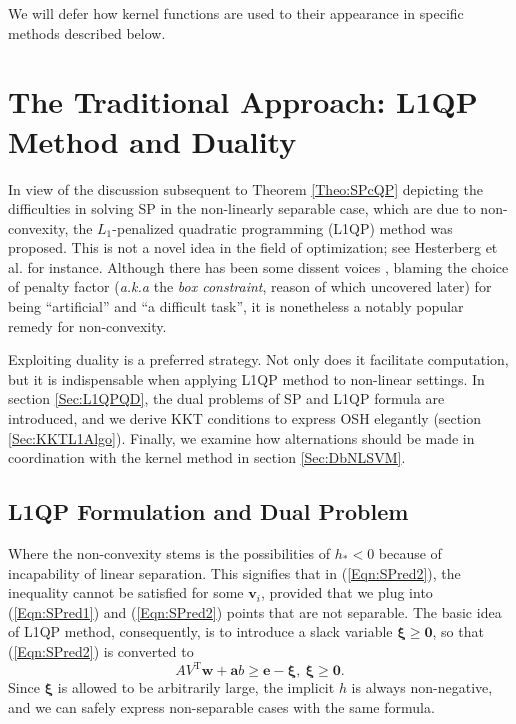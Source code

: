\documentclass[11pt,a4paper]{article}
\theoremstyle{definition}
\renewcommand{\vec}[1]{\boldsymbol{#1}}
\begin{document}
      We will defer how kernel functions are used to their appearance in specific methods described below.

  \section{The Traditional Approach: L1QP Method and Duality\label{Sec:L1QP}}
    In view of the discussion subsequent to Theorem \ref{Theo:SPcQP} depicting the difficulties in solving SP in the non-linearly separable case, which are due to non-convexity, the $L_{1}$-penalized quadratic programming (L1QP) method was proposed. This is not a novel idea in the field of optimization; see Hesterberg et al. \cite{hesterberg2008least} for instance. Although there has been some dissent voices \cite{fletcher2010binary}, blaming the choice of penalty factor (\textit{a.k.a} the \textit{box constraint}, reason of which uncovered later) for being ``artificial'' and ``a difficult task'', it is nonetheless a notably popular remedy for non-convexity.

    Exploiting duality is a preferred strategy. Not only does it facilitate computation, but it is indispensable when applying L1QP method to non-linear settings. In section \ref{Sec:L1QPQD}, the dual problems of SP and L1QP formula are introduced, and we derive KKT conditions to express OSH elegantly (section \ref{Sec:KKTL1Algo}). Finally, we examine how alternations should be made in coordination with the kernel method in section \ref{Sec:DbNLSVM}.

    \subsection{L1QP Formulation and Dual Problem\label{Sec:L1QPQD}}
      Where the non-convexity stems is the possibilities of $h_{*}<0$ because of incapability of linear separation. This signifies that in (\ref{Eqn:SPred2}), the inequality cannot be satisfied for some $\vec{v}_{i}$, provided that we plug into (\ref{Eqn:SPred1}) and (\ref{Eqn:SPred2}) points that are not separable. The basic idea of L1QP method, consequently, is to introduce a slack variable $\vec{\xi}\geq\vec{0}$, so that (\ref{Eqn:SPred2}) is converted to
      \begin{equation}\label{Eqn:L1QP2}
        AV^{\mathrm{T}}\vec{w}+\vec{a}b\geq\vec{e}-\vec{\xi},~\vec{\xi}\geq\vec{0}.
      \end{equation}
      Since $\vec{\xi}$ is allowed to be arbitrarily large, the implicit $h$ is always non-negative, and we can safely express non-separable cases with the same formula.
\end{document}
